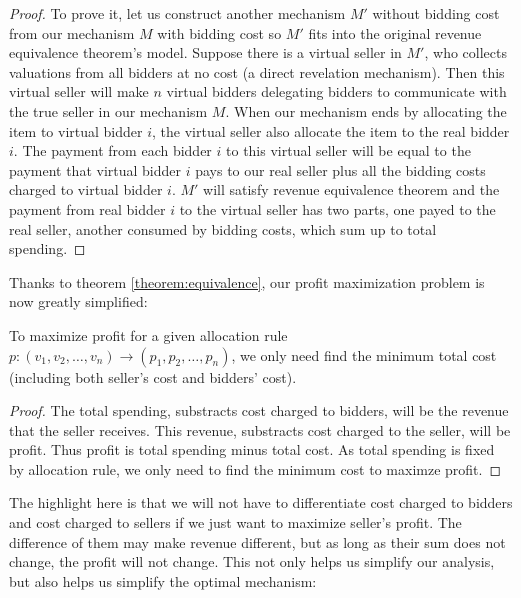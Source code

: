 \begin{proof}
To prove it, let us construct another mechanism
$M'$ without bidding cost from our mechanism $M$ with bidding cost so $M'$ fits
into the original revenue equivalence theorem's model. Suppose there is a
virtual seller in $M'$, who collects valuations from all bidders at no cost (a
direct revelation mechanism). Then this virtual seller will make $n$ virtual
bidders delegating bidders to communicate with the true seller in our mechanism
$M$.  When our mechanism ends by allocating the item to virtual bidder $i$, the
virtual seller also allocate the item to the real bidder $i$. The payment from
each bidder $i$ to this virtual seller will be equal to the payment that
virtual bidder $i$ pays to our real seller plus all the bidding costs charged
to virtual bidder $i$.
$M'$ will satisfy revenue equivalence theorem and
the payment from real bidder
$i$ to the virtual seller has two parts, one payed to the real
seller, another consumed by bidding costs, which sum up to total spending.
\end{proof}

Thanks to theorem \ref{theorem:equivalence}, our profit maximization problem
is now greatly simplified: 

\begin{corollary}
To maximize profit for a given allocation rule $p: (v_1, v_2, \ldots, v_n)
\rightarrow (p_1, p_2, \ldots, p_n)$, we only need find the minimum total cost
(including both seller's cost and bidders' cost).
\end{corollary}

\begin{proof}
The total spending, substracts cost charged to bidders, will be the revenue
that the seller receives.  This revenue, substracts cost charged to the seller,
will be profit. Thus profit is total spending minus total cost. As total
spending is fixed by allocation rule, we only need to find the minimum cost to
maximze profit.
\end{proof}

The highlight here is that we will not have to differentiate cost charged to
bidders and cost charged to sellers if we just want to maximize seller's profit.
The difference of them may make revenue different, but as long as their sum
does not change, the profit will not change. This not only helps us simplify our
analysis, but also helps us simplify the optimal mechanism: 

